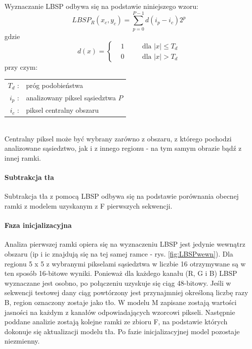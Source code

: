 Wyznaczanie LBSP odbywa się na podstawie niniejszego wzoru:
\begin{equation}
LBSP_{R}(x_{c},y_{c}) = 
\sum_{p=0}^{P-1}d(i_{p}-i_{c})2^p
\end{equation}
gdzie
\begin{equation}
d(x)=\left\{
\begin{split}
&1 & \quad &\text{dla $|x|\leq T_{d}$} \\
&0 & \quad &\text{dla $|x|>T_{d}$}
\end{split}
\right.
\end{equation}
przy czym:\\ 
\hspace*{3em}
\begin{tabular}{r l}
$T_{d}$ : &  próg podobieństwa\\
$i_{p}$ : & analizowany piksel sąsiedztwa $P$\\
$i_{c}$ : & piksel centralny obszaru\\
\end{tabular} \\

Centralny piksel może być wybrany zarówno z obszaru, z którego pochodzi analizowane sąsiedztwo, jak i z innego regionu - na tym samym obrazie bądź z innej ramki.
\paragraph{Subtrakcja tła \\}
Subtrakcja tła z pomocą LBSP odbywa się na podstawie porównania obecnej ramki z modelem uzyskanym z F pierwszych sekwencji. 
\paragraph{Faza inicjalizacyjna \\}
Analiza pierwszej ramki opiera się na wyznaczeniu LBSP  jest jedynie wewnątrz obszaru (ip i ic znajdują się na tej samej ramce - rys. \ref{fig:LBSPwewn}). Dla regionu 5 x 5 z wybranymi pikselami sąsiedztwa w liczbie 16 otrzymywane są w ten sposób 16-bitowe wyniki. Ponieważ dla każdego kanału (R, G i B) LBSP wyznaczane jest osobno, po połączeniu uzyskuje się ciąg 48-bitowy. Jeśli w sekwencji testowej dany ciąg powtórzony jest przynajmniej określoną liczbę razy B, region oznaczony zostaje jako tło. W modelu M zapisane zostają wartości jasności na każdym z kanałów odpowiadających wzorcowi pikseli. Następnie poddane analizie zostają kolejne ramki ze zbioru F, na podstawie których dokonuje się aktualizacji modelu tła. Po fazie inicjalizacyjnej model pozostaje niezmienny.
